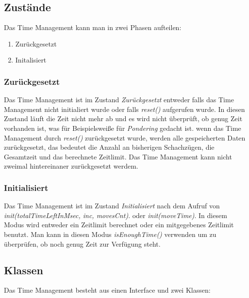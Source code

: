 \subsection{Zust\"ande}
Das Time Management kann man in zwei Phasen aufteilen: 
\begin{enumerate}
    \item{Zur\"uckgesetzt}
    \item{Initalisiert}
\end{enumerate}

\subsubsection{Zur\"uckgesetzt}
Das Time Management ist im Zustand \textit{Zur\"uckgesetzt} entweder falls das Time Management nicht initialiert wurde oder falls \textit{reset()} aufgerufen wurde. In diesen Zustand l\"auft die Zeit nicht mehr ab und es wird nicht \"uberpr\"uft, ob genug Zeit vorhanden ist, was f\"ur Beispielsweiße f\"ur \textit{Pondering} gedacht ist.
\newline wenn das Time Management durch \textit{reset()} zur\"uckgesetzt wurde, werden alle gespeicherten Daten zur\"uckgesetzt, das bedeutet die Anzahl an bisherigen Schachz\"ugen, die Gesamtzeit und das berechnete Zeitlimit. 
\newline Das Time Management kann nicht zweimal hintereinaner zur\"uckgesetzt werdem.

\subsubsection{Initialisiert}
Das Time Management ist im Zustand \textit{Initialisiert} nach dem Aufruf von \textit{init(totalTimeLeftInMsec, inc, movesCnt)}. oder \textit{init(moveTime)}.\newline
In diesem Modus wird entweder ein Zeitlimit berechnet oder ein mitgegebenes Zeitlimit benutzt. Man kann in diesen Modus \textit{isEnoughTime()} verwenden um zu \"uberpr\"ufen, ob noch genug Zeit zur Verfügung steht.

\subsection{Klassen}
Das Time Management besteht aus einen Interface und zwei Klassen:
